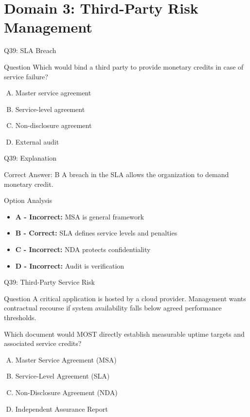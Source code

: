 \documentclass{beamer}
\begin{document}
	
	
	\section{Domain 3: Third-Party Risk Management}
	
	\begin{frame}{Q39: SLA Breach}
		\begin{block}{Question}
			Which would bind a third party to provide monetary credits in case of service failure?
		\end{block}
		\begin{enumerate}[(A)]
			\item Master service agreement
			\item Service-level agreement
			\item Non-disclosure agreement
			\item External audit
		\end{enumerate}
	\end{frame}
	
	\begin{frame}{Q39: Explanation}
		\begin{block}{Correct Answer: B}
			A breach in the SLA allows the organization to demand monetary credit.
		\end{block}
		\begin{block}{Option Analysis}
			\begin{itemize}
				\item \textbf{A - Incorrect:} MSA is general framework
				\item \textbf{B - Correct:} SLA defines service levels and penalties
				\item \textbf{C - Incorrect:} NDA protects confidentiality
				\item \textbf{D - Incorrect:} Audit is verification
			\end{itemize}
		\end{block}
	\end{frame}
	
	
\begin{frame}{Q39: Third-Party Service Risk}
	\begin{block}{Question}
		A critical application is hosted by a cloud provider. Management
		wants contractual recourse if system availability falls below
		agreed performance thresholds.
		
		Which document would MOST directly establish measurable uptime
		targets and associated service credits?
	\end{block}
	
	\begin{enumerate}[(A)]
		\item Master Service Agreement (MSA)
		\item Service-Level Agreement (SLA)
		\item Non-Disclosure Agreement (NDA)
		\item Independent Assurance Report
	\end{enumerate}
\end{frame}
\end{document}
